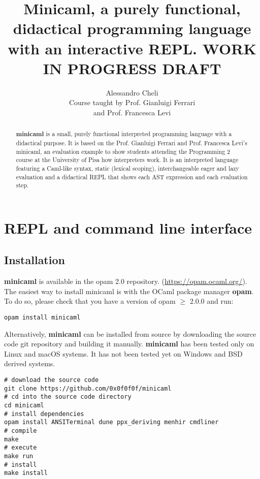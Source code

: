 \documentclass[a4paper, 11pt]{article}
\title{Minicaml, a purely functional, didactical programming language with an
interactive REPL. WORK IN PROGRESS DRAFT}
\author{Alessandro Cheli\\Course taught by Prof. Gianluigi Ferrari\\and Prof. Francesca Levi}
\begin{document}
\maketitle

\begin{abstract}
\textbf{minicaml} is a small, purely functional interpreted programming language
with a didactical purpose. It is based on the Prof. Gianluigi Ferrari and Prof.
Francesca Levi's minicaml, an evaluation example to show students attending the
Programming 2 course at the University of Pisa how interpreters work. It is an
interpreted language featuring a Caml-like syntax, static (lexical scoping),
interchangeable eager and lazy evaluation and a didactical REPL that
shows each AST expression and each evaluation step.
\end{abstract}

\section{REPL and command line interface}
\subsection{Installation}
\textbf{minicaml} is available in the opam 2.0 repository.
(\url{https://opam.ocaml.org/}). The easiest way to install minicaml is with the
OCaml package manager \textbf{opam}. To do so, please check that you have a version of opam $\geq$
2.0.0 and run:
\begin{lstlisting}[style=bash]
opam install minicaml
\end{lstlisting}
Alternatively, \textbf{minicaml} can be installed from source by downloading the
source code git repository and building it manually. \textbf{minicaml} has been tested
only on Linux and macOS systems. It has not been tested yet on Windows and BSD
derived systems.
\begin{lstlisting}[style=bash]
# download the source code
git clone https://github.com/0x0f0f0f/minicaml
# cd into the source code directory
cd minicaml
# install dependencies
opam install ANSITerminal dune ppx_deriving menhir cmdliner
# compile
make
# execute
make run
# install
make install
\end{lstlisting}
\end{document}
